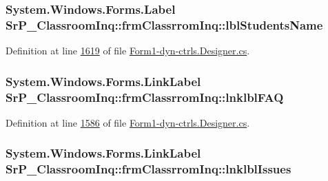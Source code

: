 \hypertarget{class_sr_p___classroom_inq_1_1frm_classrrom_inq_ac87221e35b87aece56933aba4e90d11e}{
\subsubsection[{lbl\-Students\-Name}]{\setlength{\rightskip}{0pt plus 5cm}\-System.\-Windows.\-Forms.\-Label {\bf \-Sr\-P\-\_\-\-Classroom\-Inq\-::frm\-Classrrom\-Inq\-::lbl\-Students\-Name}}}
\label{class_sr_p___classroom_inq_1_1frm_classrrom_inq_ac87221e35b87aece56933aba4e90d11e}


\-Definition at line \hyperlink{_form1-dyn-ctrls_8_designer_8cs_source_l01619}{1619} of file \hyperlink{_form1-dyn-ctrls_8_designer_8cs_source}{\-Form1-\/dyn-\/ctrls.\-Designer.\-cs}.

\hypertarget{class_sr_p___classroom_inq_1_1frm_classrrom_inq_a1e6a5b0878f7c27c5d8f83941f5ba05b}{
\subsubsection[{lnklbl\-F\-A\-Q}]{\setlength{\rightskip}{0pt plus 5cm}\-System.\-Windows.\-Forms.\-Link\-Label {\bf \-Sr\-P\-\_\-\-Classroom\-Inq\-::frm\-Classrrom\-Inq\-::lnklbl\-F\-A\-Q}}}
\label{class_sr_p___classroom_inq_1_1frm_classrrom_inq_a1e6a5b0878f7c27c5d8f83941f5ba05b}


\-Definition at line \hyperlink{_form1-dyn-ctrls_8_designer_8cs_source_l01586}{1586} of file \hyperlink{_form1-dyn-ctrls_8_designer_8cs_source}{\-Form1-\/dyn-\/ctrls.\-Designer.\-cs}.

\hypertarget{class_sr_p___classroom_inq_1_1frm_classrrom_inq_a814cf817eced89d772f9cba1053bf81b}{
\subsubsection[{lnklbl\-Issues}]{\setlength{\rightskip}{0pt plus 5cm}\-System.\-Windows.\-Forms.\-Link\-Label {\bf \-Sr\-P\-\_\-\-Classroom\-Inq\-::frm\-Classrrom\-Inq\-::lnklbl\-Issues}}}
\label{class_sr_p___classroom_inq_1_1frm_classrrom_inq_a814cf817eced89d772f9cba1053bf81b}


